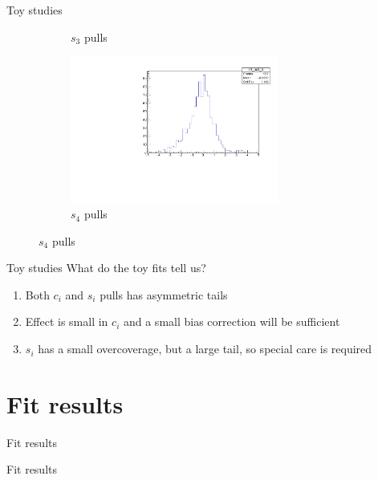 \documentclass{beamer}
\begin{document}
\begin{frame}{Toy studies}
\begin{figure}
\begin{subfigure}{0.5\textwidth}
      \caption{$s_3$ pulls}
    \end{subfigure}%
    \begin{subfigure}{0.5\textwidth}
      \centering
      \includegraphics[width=0.75\textwidth]{Plots/s4_ToyFits_pull.pdf}
      \caption{$s_4$ pulls}
    \end{subfigure}
  \end{figure}
\end{frame}

\begin{frame}{Toy studies}
  \vspace{0.0cm}
  {\Large What do the toy fits tell us?}
  \vspace{1.0cm}
  \begin{enumerate}
    \setlength\itemsep{2.0em}
    \item{Both $c_i$ and $s_i$ pulls has asymmetric tails}
    \item{Effect is small in $c_i$ and a small bias correction will be sufficient}
    \item{$s_i$ has a small overcoverage, but a large tail, so special care is required}
  \end{enumerate}
\end{frame}

\section{Fit results}
\begin{frame}{Fit results}
  \begin{center}
    {\huge Fit results}
  \end{center}
\end{frame}
\end{document}
